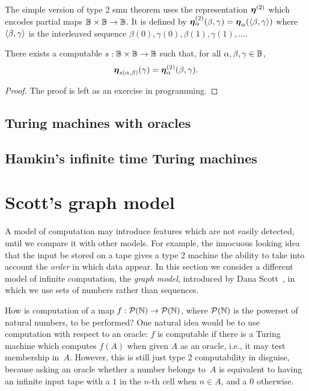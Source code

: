 The simple version of type 2 smn theorem uses the representation
$\text{\boldmath{$\eta$}}^{(2)}$ which encodes partial maps $\mathbb{B} \times \mathbb{B} \to
\mathbb{B}$. It is defined by $\text{\boldmath{$\eta$}}^{(2)}_{\alpha}(\beta, \gamma) =
\text{\boldmath{$\eta$}}_{\alpha}(\langle \beta, \gamma \rangle)$ where $\langle \beta, \gamma \rangle$ is
the interleaved sequence $\beta(0), \gamma(0), \beta(1), \gamma(1),
\ldots$.

\begin{theorem}
  There exists a computable $s : \mathbb{B} \times \mathbb{B} \to \mathbb{B}$ such
  that, for all $\alpha, \beta, \gamma \in \mathbb{B}$,
  \begin{equation*}
    \text{\boldmath{$\eta$}}_{s(\alpha, \beta)}(\gamma) = \text{\boldmath{$\eta$}}^{(2)}_{\alpha}(\beta, \gamma).
  \end{equation*}
\end{theorem}

\begin{proof}
  The proof is left as an exercise in programming.
\end{proof}

\subsection{Turing machines with oracles}
\label{sec:turing-machines-with}

\subsection{Hamkin's infinite time Turing machines}


\section{Scott's graph model}
\label{sec:graph-model}

A model of computation may introduce features which are not easily
detected, until we compare it with other models. For example, the
innocuous looking idea that the input be stored on a tape gives a type
2 machine the ability to take into account the \emph{order} in which
data appear. In this section we consider a different model of infinite
computation, the \emph{graph model}, introduced by Dana
Scott~, in which we use sets of numbers rather than
sequences.

How is computation of a map $f : \mathcal{P}(\mathbb{N}) \to \mathcal{P}(\mathbb{N})$, where
$\mathcal{P}(\mathbb{N})$ is the powerset of natural numbers, to be performed? One
natural idea would be to use computation with respect to an oracle:
$f$ is computable if there is a Turing machine which computes $f(A)$
when given $A$ as an oracle, i.e., it may test membership in~$A$.
However, this is still just type 2 computability in disguise, because
asking an oracle whether a number belongs to~$A$ is equivalent to
having an infinite input tape with a $1$ in the $n$-th cell when $n
\in A$, and a $0$ otherwise.

